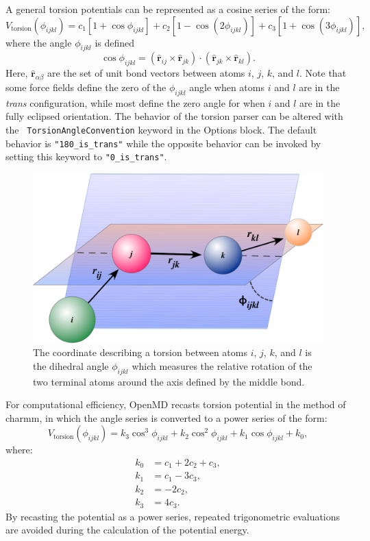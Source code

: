 \documentclass[]{book}
\begin{document}
A general torsion potentials can be represented as a cosine series of
the form:
\begin{equation}
V_{\text{torsion}}(\phi_{ijkl}) = c_1[1 + \cos \phi_{ijkl}] 
	+ c_2[1 - \cos(2\phi_{ijkl})] 
 	+ c_3[1 + \cos(3\phi_{ijkl})],
\label{eq:origTorsionPot}
\end{equation}
where the angle $\phi_{ijkl}$ is defined 
\begin{equation}
\cos\phi_{ijkl} = (\hat{\mathbf{r}}_{ij} \times \hat{\mathbf{r}}_{jk}) \cdot
	(\hat{\mathbf{r}}_{jk} \times \hat{\mathbf{r}}_{kl}).
\label{eq:torsPhi}
\end{equation}
Here, $\hat{\mathbf{r}}_{\alpha\beta}$ are the set of unit bond
vectors between atoms $i$, $j$, $k$, and $l$.  Note that some force
fields define the zero of the $\phi_{ijkl}$ angle when atoms $i$ and
$l$ are in the {\em trans} configuration, while most define the zero
angle for when $i$ and $l$ are in the fully eclipsed orientation.  The
behavior of the torsion parser can be altered with the {\tt
  TorsionAngleConvention} keyword in the Options block.  The default
behavior is {\tt "180\_is\_trans"} while the opposite behavior can be
invoked by setting this keyword to {\tt "0\_is\_trans"}.

\begin{figure}[h]
\centering
\includegraphics[width=4.5in]{torsion.pdf}
\caption[Torsion or dihedral angle coordinates]{The coordinate
  describing a torsion between atoms $i$, $j$, $k$, and $l$ is the
  dihedral angle $\phi_{ijkl}$ which measures the relative rotation of
  the two terminal atoms around the axis defined by the middle bond. }
\label{fig:torsion}
\end{figure}

For computational efficiency, OpenMD recasts torsion potential in the
method of {\sc charmm},\cite{Brooks83} in which the angle series is
converted to a power series of the form:
\begin{equation}
  V_{\text{torsion}}(\phi_{ijkl}) =  
  k_3 \cos^3 \phi_{ijkl} + k_2 \cos^2 \phi_{ijkl} + k_1 \cos \phi_{ijkl} + k_0,
\label{eq:torsionPot}
\end{equation}
where:
\begin{align*}
k_0 &= c_1 + 2 c_2 + c_3, \\
k_1 &= c_1 - 3c_3, \\
k_2 &= - 2 c_2, \\
k_3 &= 4 c_3.
\end{align*}
By recasting the potential as a power series, repeated trigonometric
evaluations are avoided during the calculation of the potential
energy.
\end{document}
